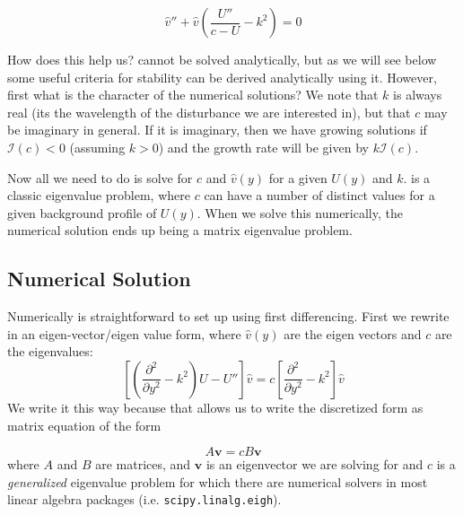 \documentclass[11pt]{article}
\begin{document}
\begin{equation}
\label{eq:Rayleigh}
  \hat{v}'' + \hat{v}\left(\frac{U''}{c-U} - k^2\right) = 0
\end{equation}

How does this help us?   cannot be solved analytically, but as we will see below some useful criteria for stability can be derived analytically using it.  However, first what is the character of the numerical solutions?  We note that $k$ is always real (its the wavelength of the disturbance we are interested in), but that $c$ may be imaginary in general.  If it is imaginary, then we have growing solutions if $\mathcal{I}(c) < 0$ (assuming $k>0$) and the growth rate will be given by $k\mathcal{I}(c)$.

Now all we need to do is solve for $c$ and $\hat{v}(y)$ for a given $U(y)$ and $k$.  is a classic eigenvalue problem, where $c$ can have a number of distinct values for a given background profile of $U(y)$.  When we solve this numerically, the numerical solution ends up being a matrix eigenvalue problem.  

\subsection{Numerical Solution}

Numerically  is straightforward to set up using first differencing.  First we rewrite in an eigen-vector/eigen value form, where $\hat{v}(y)$ are the eigen vectors and $c$ are the eigenvalues:
\begin{equation}
  \left[ \left(\frac{\partial^2}{\partial y^2} - k^2\right) U - U''\right]\hat{v} = c \left[ \frac{\partial^2}{\partial y^2} - k^2\right] \hat{v} 
\end{equation}
We write it this way because that allows us to write the discretized form as matrix equation of the form 

\begin{equation}
 A \mathbf{v} = c B \mathbf{v}
\end{equation}
where $A$ and $B$ are matrices, and $\mathbf{v}$ is an eigenvector we are solving for and $c$ is a \emph{generalized} eigenvalue problem for which there are numerical solvers in most linear algebra packages (i.e. \texttt{scipy.linalg.eigh}).  
\end{document}
